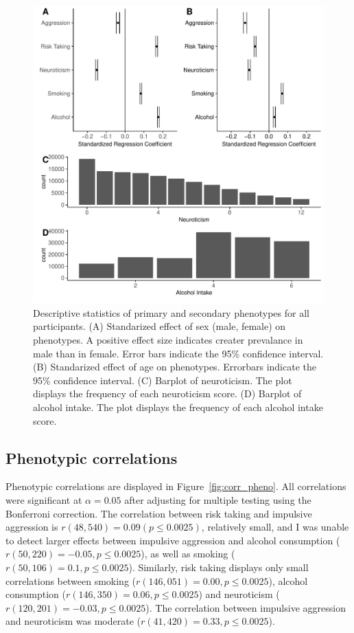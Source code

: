 \begin{figure}[htpb]
  \centering
  \includegraphics[width=0.8\linewidth]{figure/phenotype/descriptives_plots.pdf}
  \caption{
    Descriptive statistics of primary and secondary phenotypes for all participants.
    (A) Standarized effect of sex (male, female) on phenotypes. 
    A positive effect size indicates creater prevalance in male than in female.
    Error bars indicate the 95\% confidence interval.
    (B) Standarized effect of age on phenotypes.
    Errorbars indicate the 95\% confidence interval.
    (C) Barplot of neuroticism.
    The plot displays the frequency of each neuroticism score.
    (D) Barplot of alcohol intake.
    The plot displays the frequency of each alcohol intake score.
  }\label{fig:disc}
\end{figure}

\subsection{Phenotypic correlations}
\label{sub:phenotype_correlations}

Phenotypic correlations are displayed in Figure~\ref{fig:corr_pheno}. 
All correlations were significant at $\alpha=0.05$ after adjusting for multiple testing using the Bonferroni correction.
The correlation between risk taking and impulsive aggression is  $r(48,540)=0.09 (p\leq0.0025)$, relatively small,
and I was unable to detect larger effects between impulsive aggression and alcohol consumption ($r(50,220)=-0.05, p\leq0.0025$),
as well as smoking ($r(50,106)=0.1, p\leq0.0025$).
Similarly, risk taking displays only small correlations between
smoking ($r(146,051)=0.00, p\leq0.0025$),
alcohol consumption ($r(146,350)=0.06, p\leq0.0025$)
and neuroticism ($r(120,201)=-0.03, p\leq0.0025$). 
The correlation between impulsive aggression and neuroticism was moderate ($r(41,420)=0.33, p\leq0.0025$).

